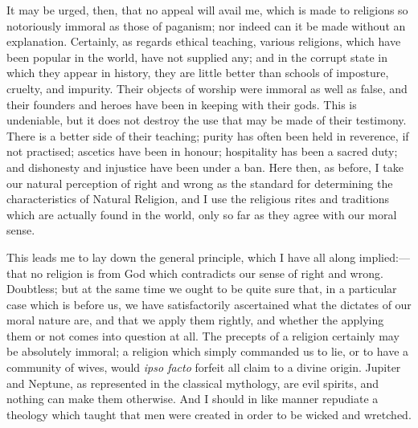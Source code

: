 It may be urged, then, that no appeal will avail me, which is made
to religions so notoriously immoral as those of paganism; nor indeed
can it be made without an explanation. Certainly, as regards ethical
teaching, various religions, which have been popular in the world,
have not supplied any; and in the corrupt state in which they appear
in history, they are little better than schools of imposture, cruelty,
and impurity. Their objects of worship were immoral as well as false,
and their founders and heroes have been in keeping with their
gods. This is undeniable, but it does not destroy the use that may be
made of their testimony. There is a better side of their teaching;
purity has often been held in reverence, if not practised; ascetics
have been in honour; hospitality has been a sacred duty; and
dishonesty and injustice have been under a ban. Here then, as before,
I take our natural perception of right and wrong as the standard for
determining the characteristics of Natural Religion, and I use the
religious rites and traditions which are actually found in the world,
only so far as they agree with our moral sense.

This leads me to lay down the general principle, which I have all
along implied:—that no religion is from God which contradicts our
sense of right and wrong. Doubtless; but at the same time we ought to
be quite sure that, in a particular case which is before us, we have
satisfactorily ascertained what the dictates of our moral nature are,
and that we apply them rightly, and whether the applying them or not
comes into question at all. The precepts of a religion certainly may
be absolutely immoral; a religion which simply commanded us to lie, or
to have a community of wives, would \emph{ipso facto} forfeit all
claim to a divine origin. Jupiter and Neptune, as represented in the
classical mythology, are evil spirits, and nothing can make them
otherwise. And I should in like manner repudiate a theology which
taught that men were created in order to be wicked and wretched.

